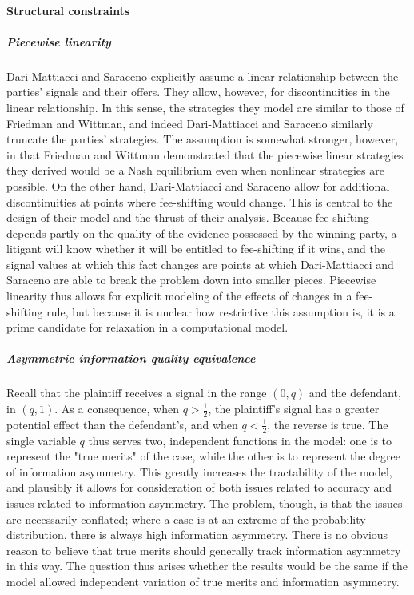 \documentclass{article}
\begin{document}
\paragraph{Structural constraints}
\subparagraph{Piecewise linearity} Dari-Mattiacci and Saraceno explicitly assume a linear relationship between the parties' signals and their offers. They allow, however, for discontinuities in the linear relationship. In this sense, the strategies they model are similar to those of Friedman and Wittman, and indeed Dari-Mattiacci and Saraceno similarly truncate the parties' strategies. The assumption is somewhat stronger, however, in that Friedman and Wittman demonstrated that the piecewise linear strategies they derived would be a Nash equilibrium even when nonlinear strategies are possible. On the other hand, Dari-Mattiacci and Saraceno allow for additional discontinuities at points where fee-shifting would change. This is central to the design of their model and the thrust of their analysis. Because fee-shifting depends partly on the quality of the evidence possessed by the winning party, a litigant will know whether it will be entitled to fee-shifting if it wins, and the signal values at which this fact changes are points at which Dari-Mattiacci and Saraceno are able to break the problem down into smaller pieces. Piecewise linearity thus allows for explicit modeling of the effects of changes in a fee-shifting rule, but because it is unclear how restrictive this assumption is, it is a prime candidate for relaxation in a computational model.
\subparagraph{Asymmetric information quality equivalence} Recall that the plaintiff receives a signal in the range $(0,q)$ and the defendant, in $(q,1)$. As a consequence, when $q > \frac{1}{2}$, the plaintiff's signal has a greater potential effect than the defendant's, and when $q < \frac{1}{2}$, the reverse is true. The single variable $q$ thus serves two, independent functions in the model: one is to represent the "true merits" of the case, while the other is to represent the degree of information asymmetry. This greatly increases the tractability of the model, and plausibly it allows for consideration of both issues related to accuracy and issues related to information asymmetry. The problem, though, is that the issues are necessarily conflated; where a case is at an extreme of the probability distribution, there is always high information asymmetry. There is no obvious reason to believe that true merits should generally track information asymmetry in this way. The question thus arises whether the results would be the same if the model allowed independent variation of true merits and information asymmetry. 
\end{document}
